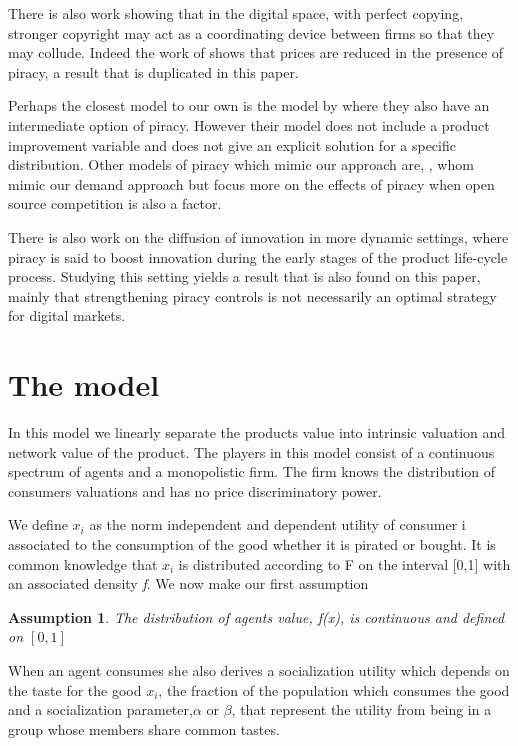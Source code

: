 \documentclass{article}
\newtheorem{assumption}{Assumption}
\begin{document}
There is also work showing that in the digital space, with perfect copying, stronger copyright may act as a coordinating device between firms so that they may collude\citep{J08}. Indeed the work of \citep{S04} shows that prices are reduced in the presence of piracy, a result that is duplicated in this paper.

Perhaps the closest model to our own is the model by \cite{CRP91} where they also have an intermediate option of piracy. However their model does not include a product improvement variable and does not give an explicit solution for a specific distribution. Other models of piracy which mimic our approach are, \cite{MRSS17}, whom mimic our demand approach but focus more on the effects of piracy when open source competition is also a factor. 

There is also work on the diffusion of innovation in more dynamic settings, where piracy is said to boost innovation during the early stages of the product life-cycle process. Studying this setting yields a result that is also found on this paper, mainly that strengthening piracy controls is not necessarily an optimal strategy for digital markets. \citep{G03}  \citep{GMM95} 
 

\section{The model}

In this model we linearly separate the products value into intrinsic valuation and network value of the product. The players in this model consist of a continuous spectrum of agents and a monopolistic firm. The firm knows the distribution of consumers valuations and has no  price discriminatory power. 

We define $x_i$ as the norm independent and dependent utility of consumer i associated to the consumption of the good whether it is pirated or bought. It is common knowledge that $x_i$ is distributed according to F on the interval [0,1] with an associated density \textit{f}. We now make our first assumption

\begin{assumption}
The distribution of agents value, f(x), is continuous and defined on $[0,1]$
\end{assumption}

When an agent consumes she also derives a socialization utility which depends on the taste for the good $x_i$, the fraction of the population which consumes the good and a socialization parameter,$\alpha$ or $\beta$, that represent the utility from being in a group whose members share common tastes. 
\end{document}
